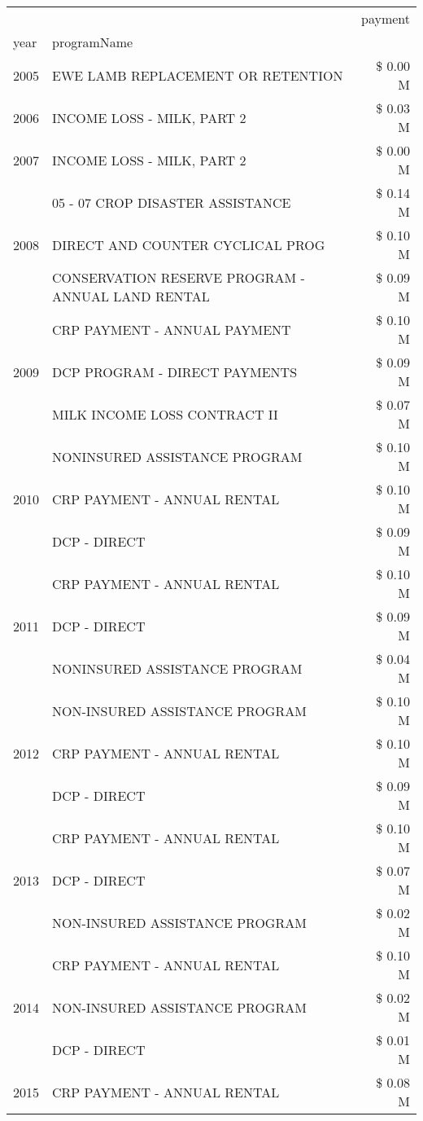 \begin{tabular}{llr}
\toprule
 &  & payment \\
year & programName &  \\
\midrule
2005 & EWE LAMB REPLACEMENT OR RETENTION & \$ 0.00 M \\
\cline{1-3}
2006 & INCOME LOSS - MILK, PART 2 & \$ 0.03 M \\
\cline{1-3}
2007 & INCOME LOSS - MILK, PART 2 & \$ 0.00 M \\
\cline{1-3}
\multirow[t]{3}{*}{2008} & 05 - 07 CROP DISASTER ASSISTANCE & \$ 0.14 M \\
 & DIRECT AND COUNTER CYCLICAL PROG & \$ 0.10 M \\
 & CONSERVATION RESERVE PROGRAM - ANNUAL LAND RENTAL & \$ 0.09 M \\
\cline{1-3}
\multirow[t]{3}{*}{2009} & CRP PAYMENT - ANNUAL PAYMENT & \$ 0.10 M \\
 & DCP PROGRAM - DIRECT PAYMENTS & \$ 0.09 M \\
 & MILK INCOME LOSS CONTRACT II & \$ 0.07 M \\
\cline{1-3}
\multirow[t]{3}{*}{2010} & NONINSURED ASSISTANCE PROGRAM & \$ 0.10 M \\
 & CRP PAYMENT - ANNUAL RENTAL & \$ 0.10 M \\
 & DCP - DIRECT & \$ 0.09 M \\
\cline{1-3}
\multirow[t]{3}{*}{2011} & CRP PAYMENT - ANNUAL RENTAL & \$ 0.10 M \\
 & DCP - DIRECT & \$ 0.09 M \\
 & NONINSURED ASSISTANCE PROGRAM & \$ 0.04 M \\
\cline{1-3}
\multirow[t]{3}{*}{2012} & NON-INSURED ASSISTANCE PROGRAM & \$ 0.10 M \\
 & CRP PAYMENT - ANNUAL RENTAL & \$ 0.10 M \\
 & DCP - DIRECT & \$ 0.09 M \\
\cline{1-3}
\multirow[t]{3}{*}{2013} & CRP PAYMENT - ANNUAL RENTAL & \$ 0.10 M \\
 & DCP - DIRECT & \$ 0.07 M \\
 & NON-INSURED ASSISTANCE PROGRAM & \$ 0.02 M \\
\cline{1-3}
\multirow[t]{3}{*}{2014} & CRP PAYMENT - ANNUAL RENTAL & \$ 0.10 M \\
 & NON-INSURED ASSISTANCE PROGRAM & \$ 0.02 M \\
 & DCP - DIRECT & \$ 0.01 M \\
\cline{1-3}
\multirow[t]{3}{*}{2015} & CRP PAYMENT - ANNUAL RENTAL & \$ 0.08 M \\

\end{tabular}
